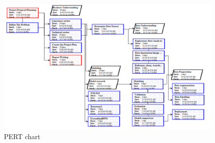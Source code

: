 \documentclass[stu,12pt,floatsintext]{apa7}
\begin{document}
\begin{figure}
    \centering
    \includegraphics[width=\linewidth]{images/pert.png}
    \caption{PERT chart}
    \label{fig:pert}
\end{figure}
\end{document}
